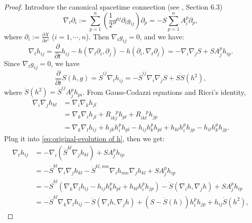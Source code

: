 \documentclass[reqno]{amsart}
\theoremstyle{remark}
\newcommand{\pd}[2]{\frac{\partial {#1}}{\partial {#2}}}
\theoremstyle{definition}
\numberwithin{equation}{section}
\begin{document}
\begin{proof}
Introduce the canonical spacetime connection  (see \cite{Andrews-Ben-The-Ricci-Flow}, Section 6.3)
\begin{equation}\label{eq:canonical-spacetime-connection}
    \nabla_t \partial_i:= \sum_{p=1}^{n}\left(\frac{1}{2}g^{pj}\partial_t g_{ij}\right)\partial_p = -S\sum_{p=1}^{n}A_i^p \partial_p,
\end{equation}
where \(\partial_i := \pd{X}{x^i}\) (\(i=1,\cdots,n\)). Then \(\nabla_t g_{ij} = 0\), and we have:
\begin{equation}\label{eq:original-evolution of h}
    \nabla_t h_{ij} = \pd{}{t}h_{ij} - h(\nabla_t \partial_i,\partial_j) - h(\partial_i, \nabla_t \partial_j) = -\nabla_i\nabla_j S + SA_j^p h_{ip}.
\end{equation}
Since $\nabla_t g_{ij} = 0$, we have 
\begin{equation}\label{eq:original-evolution of S}
    \pd{}{t}S(h,g) = \dot{S}^{ij}\nabla_t h_{ij} = -\dot{S}^{ij}\nabla_i\nabla_j S + S\dot{S}(h^2),
\end{equation}
where \(\dot{S}(h^2) = \dot{S}^{ij}A_j^p h_{pi}\).
From Gauss-Codazzi equations and Ricci's identity,
\begin{equation}
    \begin{aligned}
        \nabla_i \nabla_j h_{kl} &= \nabla_i \nabla_k h_{jl} \\
        &= \nabla_k \nabla_i h_{jl} + R_{ikj}^{\quad p} h_{pl} + R_{ikl}^{\quad p} h_{jp} \\
        &= \nabla_k \nabla_l h_{ij} + h_{jk}h_i^p h_{pl} - h_{ij}h_k^p h_{pl} + h_{kl}h_i^p h_{jp} - h_{il}h_k^p h_{jp}.
    \end{aligned}
\end{equation}
Plug it into \eqref{eq:original-evolution of h}, then we get:
\begin{equation}
    \begin{aligned}\label{eq:eoh}
        \nabla_t h_{ij}&= -\nabla_i(\dot{S}^{kl}\nabla_j h_{kl}) + SA_j^p h_{ip} \\
        &= -\dot{S}^{kl}\nabla_i\nabla_j h_{kl} - \ddot{S}^{kl,mn}\nabla_i h_{mn}\nabla_j h_{kl} + SA_j^p h_{ip} \\
        &= -\dot{S}^{kl}(\nabla_k \nabla_l h_{ij} - h_{ij}h_k^p h_{pl} + h_{kl}h_i^p h_{jp}) - \ddot{S}(\nabla_i h, \nabla_j h) + SA_j^p h_{ip} \\
        &= -\dot{S}^{kl}\nabla_k \nabla_l h_{ij} - \ddot{S}(\nabla_i h, \nabla_j h) + (S - \dot{S}(h))h_i^p h_{jp} + h_{ij}\dot{S}(h^2),
    \end{aligned}

\end{equation}
\end{proof}
\end{document}
